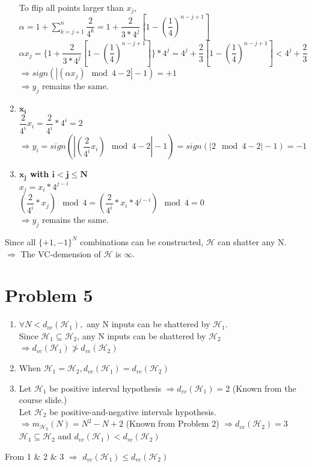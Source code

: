 \documentclass[12pt, a4paper]{article}
\begin{document}
\begin{CJK}{UTF8}{bkai}
\begin{enumerate}
			To flip all points larger than $x_j$, $\alpha = 1 + \sum\limits_{k = j+1}^{n} \dfrac{2}{4^k} = 1 + \dfrac{2}{3*4^j}[1-(\dfrac{1}{4})^{n-j+1}]$\\
			$\alpha x_j = \{1+\dfrac{2}{3*4^j}[1-(\dfrac{1}{4})^{n-j+1}]\} * 4^j = 4^j+\dfrac{2}{3}[1-(\dfrac{1}{4})^{n-j+1}] < 4^j+\dfrac{2}{3}$\\
			$\Rightarrow  sign(|(\alpha x_j)\mod 4-2|-1) = +1$\\
			$\Rightarrow y_j$ remains the same.
		\item {$\bm{x_i}$}\\
			$\dfrac{2}{4^i} x_i = \dfrac{2}{4^i}*4^i = 2$\\
			$\Rightarrow y_i = sign(|(\dfrac{2}{4^i} x_i)\mod 4-2|-1) = sign(|2\mod4-2|-1) = -1$
		\item {\bf $\bm{x_j}$ with $\bm{i < j \leq N}$}\\
			$x_j = x_i * 4^{j-i}$\\
			$(\dfrac{2}{4^i}*x_j)\mod 4 = (\dfrac{2}{4^i}*x_i*4^{j-i})\mod 4 = 0$ \\
			$\Rightarrow y_j$ remains the same.
		\end{enumerate}
		Since all $\{+1,-1\}^N$ combinations can be constructed, $\mathcal{H}$ can shatter any N.\\
		$\Rightarrow$ The VC-demension of $\mathcal{H}$ is $\infty$.

	\section*{Problem 5}
		\begin{enumerate}
		\item
			$\forall N < d_{vc}(\mathcal{H}_1),$ any N inputs can be shattered by $\mathcal{H}_1$. \\
			Since $\mathcal{H}_1 \subseteq \mathcal{H}_2$, any N inputs can be shattered by $\mathcal{H}_2$ 
			$\Rightarrow d_{vc}(\mathcal{H}_1) \ngtr d_{vc}(\mathcal{H}_2)$
		\item
			When $\mathcal{H}_1 = \mathcal{H}_2, d_{vc}(\mathcal{H}_1) = d_{vc}(\mathcal{H}_2)$
		\item
			Let $\mathcal{H}_1$ be positive interval hypothesis $\Rightarrow d_{vc}(\mathcal{H}_1) = 2$  (Known from the course slide.)\\
			Let $\mathcal{H}_2$ be positive-and-negative intervals hypothesis. \\
			$\Rightarrow m_{\mathcal{H}_2}(N)= N^2-N+2$ (Known from Problem 2) $\Rightarrow d_{vc}(\mathcal{H}_2) = 3$\\
			$\mathcal{H}_1 \subseteq \mathcal{H}_2$ and $d_{vc}(\mathcal{H}_1) < d_{vc}(\mathcal{H}_2)$
		\end{enumerate}
		From 1 \& 2 \& 3 $\Rightarrow$ $d_{vc}(\mathcal{H}_1) \leq d_{vc}(\mathcal{H}_2)$


\end{CJK}
\end{document}
